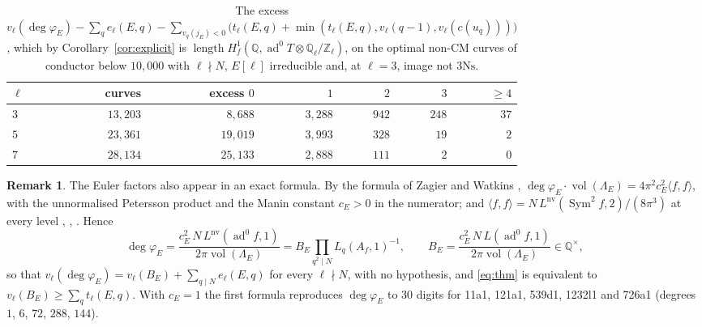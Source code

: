 \documentclass[11pt]{amsart}
\theoremstyle{definition}
\newtheorem{remark}[theorem]{Remark}
\newcommand{\Q}{\mathbb{Q}}
\newcommand{\Z}{\mathbb{Z}}
\newcommand{\degphi}{\deg\varphi_E}
\newcommand{\ad}{\operatorname{ad}^0}
\newcommand{\Sym}{\operatorname{Sym}^2}
\newcommand{\nv}{\mathrm{nv}}
\newcommand{\len}{\operatorname{length}}
\newcommand{\Ns}{3\mathrm{Ns}}
\begin{document}
\begin{table}[ht]\centering\small
\begin{tabular}{lrrrrrr}
\toprule
$\ell$ & curves & excess $0$ & $1$ & $2$ & $3$ & $\ge4$\\
\midrule
$3$ & $13{,}203$ & $8{,}688$ & $3{,}288$ & $942$ & $248$ & $37$\\
$5$ & $23{,}361$ & $19{,}019$ & $3{,}993$ & $328$ & $19$ & $2$\\
$7$ & $28{,}134$ & $25{,}133$ & $2{,}888$ & $111$ & $2$ & $0$\\
\bottomrule
\end{tabular}
\caption{The excess $v_\ell(\degphi)-\sum_qe_\ell(E,q)-\sum_{v_q(j_E)<0}\bigl(t_\ell(E,q)+\min(t_\ell(E,q),v_\ell(q-1),v_\ell(c(u_q)))\bigr)$, which by Corollary~\ref{cor:explicit} is $\len H^1_f(\Q,\ad T\otimes\Q_\ell/\Z_\ell)$, on the optimal non-CM curves of conductor below $10{,}000$ with $\ell\nmid N$, $E[\ell]$ irreducible and, at $\ell=3$, image not $\Ns$.}\label{tab:excess}
\end{table}

\begin{remark}\label{rem:degree}
The Euler factors also appear in an exact formula. By the formula of Zagier and Watkins \cite{Zagier85,Watkins02}, $\degphi\cdot\operatorname{vol}(\Lambda_E)=4\pi^2c_E^2\langle f,f\rangle$, with the unnormalised Petersson product and the Manin constant $c_E>0$ in the numerator; and $\langle f,f\rangle=N\,L^{\nv}(\Sym f,2)/(8\pi^3)$ at every level \cite{Rankin39,Shimura76}, \cite[Theorem 5.1]{Hida81}, \cite[Lemma 2.12]{DFG04}. Hence
\[
\degphi=\frac{c_E^2\,N\,L^{\nv}(\ad f,1)}{2\pi\operatorname{vol}(\Lambda_E)}=B_E\prod_{q^2\mid N}L_q(A_f,1)^{-1},\qquad B_E=\frac{c_E^2\,N\,L(\ad f,1)}{2\pi\operatorname{vol}(\Lambda_E)}\in\Q^\times,
\]
so that $v_\ell(\degphi)=v_\ell(B_E)+\sum_{q\mid N}e_\ell(E,q)$ for every $\ell\nmid N$, with no hypothesis, and \eqref{eq:thm} is equivalent to $v_\ell(B_E)\ge\sum_qt_\ell(E,q)$. With $c_E=1$ the first formula reproduces $\degphi$ to $30$ digits for 11a1, 121a1, 539d1, 1232l1 and 726a1 (degrees $1$, $6$, $72$, $288$, $144$).
\end{remark}
\end{document}
